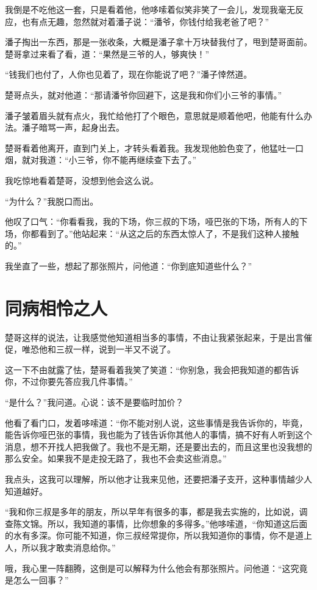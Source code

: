 我倒是不吃他这一套，只是看着他，他哆嗦着似笑非笑了一会儿，发现我毫无反应，也有点无趣，忽然就对着潘子说：“潘爷，你钱付给我老爸了吧？”

潘子掏出一东西，那是一张收条，大概是潘子拿十万块替我付了，甩到楚哥面前。楚哥拿过来看了看，道：“果然是三爷的人，够爽快！”

“钱我们也付了，人你也见着了，现在你能说了吧？”潘子悻然道。

楚哥点头，就对他道：“那请潘爷你回避下，这是我和你们小三爷的事情。”

潘子皱着眉头就有点火，我忙给他打了个眼色，意思就是顺着他吧，他能有什么办法。潘子暗骂一声，起身出去。

楚哥看着他离开，直到门关上，才转头看着我。我发现他脸色变了，他猛吐一口烟，就对我道：“小三爷，你不能再继续查下去了。”

我吃惊地看着楚哥，没想到他会这么说。

“为什么？”我脱口而出。

他叹了口气：“你看看我，我的下场，你三叔的下场，哑巴张的下场，所有人的下场，你都看到了。”他站起来：“从这之后的东西太惊人了，不是我们这种人接触的。”

我坐直了一些，想起了那张照片，问他道：“你到底知道些什么？”

\chapter{同病相怜之人}

楚哥这样的说法，让我感觉他知道相当多的事情，不由让我紧张起来，于是出言催促，唯恐他和三叔一样，说到一半又不说了。

这一下不由就露了怯，楚哥看着我笑了笑道：“你别急，我会把我知道的都告诉你，不过你要先答应我几件事情。”

“是什么？”我问道。心说：该不是要临时加价？

他看了看门口，发着哆嗦道：“你不能对别人说，这些事情是我告诉你的，毕竟，能告诉你哑巴张的事情，我也能为了钱告诉你其他人的事情，搞不好有人听到这个消息，想不开找人把我做了。我也不是无期，还是要出去的，而且这里也没我想的那么安全。如果我不是走投无路了，我也不会卖这些消息。”

我点头，这我可以理解，所以他才让我来见他，还要把潘子支开，这种事情越少人知道越好。

“我和你三叔是多年的朋友，所以早年有很多的事，都是我去实施的，比如说，调查陈文锦。所以，我知道的事情，比你想象的多得多。”他哆嗦道，“你知道这后面的水有多深。你可能不知道，你三叔经常提你，所以我知道你的事情，你不是道上人，所以我才敢卖消息给你。”

哦，我心里一阵翻腾，这倒是可以解释为什么他会有那张照片。问他道：“这究竟是怎么一回事？”

